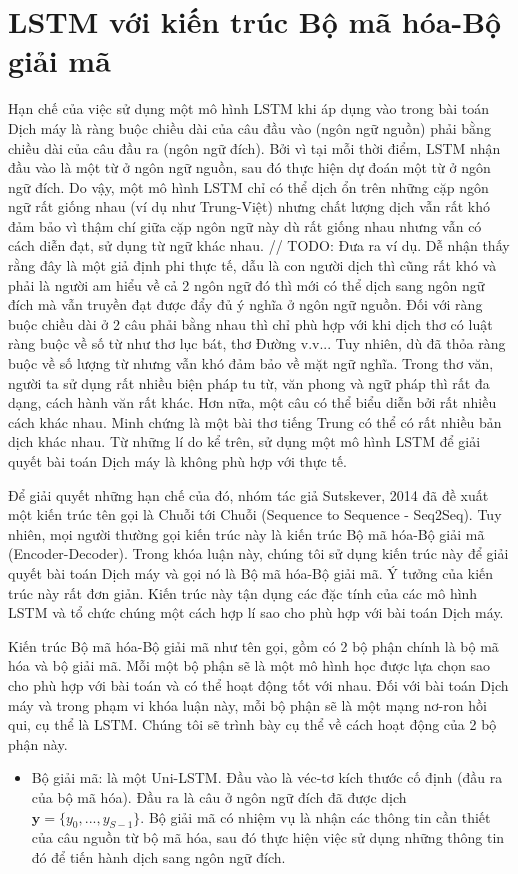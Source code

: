 \section{LSTM với kiến trúc Bộ mã hóa-Bộ giải mã}
Hạn chế của việc sử dụng một mô hình LSTM khi áp dụng vào trong bài toán Dịch máy là ràng buộc chiều dài của câu đầu vào (ngôn ngữ nguồn) phải bằng chiều dài của câu đầu ra (ngôn ngữ đích). Bởi vì tại mỗi thời điểm, LSTM nhận đầu vào là một từ ở ngôn ngữ nguồn, sau đó thực hiện dự đoán một từ ở ngôn ngữ đích. Do vậy, một mô hình LSTM chỉ có thể dịch ổn trên những cặp ngôn ngữ rất giống nhau (ví dụ như Trung-Việt) nhưng chất lượng dịch vẫn rất khó đảm bảo vì thậm chí giữa cặp ngôn ngữ này dù rất giống nhau nhưng vẫn có cách diễn đạt, sử dụng từ ngữ khác nhau. // TODO: Đưa ra ví dụ. Dễ nhận thấy rằng đây là một giả định phi thực tế, dẫu là con người dịch thì cũng rất khó và phải là người am hiểu về cả 2 ngôn ngữ đó thì mới có thể dịch sang ngôn ngữ đích mà vẫn truyền đạt được đẩy đủ ý nghĩa ở ngôn ngữ nguồn. Đối với ràng buộc chiều dài ở 2 câu phải bằng nhau thì chỉ phù hợp với khi dịch thơ có luật ràng buộc về số từ như thơ lục bát, thơ Đường v.v... Tuy nhiên, dù đã thỏa ràng buộc về số lượng từ nhưng vẫn khó đảm bảo về mặt ngữ nghĩa. Trong thơ văn, người ta sử dụng rất nhiều biện pháp tu từ, văn phong và ngữ pháp thì rất đa dạng, cách hành văn rất khác. Hơn nữa, một câu có thể biểu diễn bởi rất nhiều cách khác nhau. Minh chứng là một bài thơ tiếng Trung có thể có rất nhiều bản dịch khác nhau. Từ những lí do kể trên, sử dụng một mô hình LSTM để giải quyết bài toán Dịch máy là không phù hợp với thực tế. 

Để giải quyết những hạn chế của đó, nhóm tác giả Sutskever, 2014 \cite{Seq2Seq2014} đã đề xuất một kiến trúc tên gọi là Chuỗi tới Chuỗi (Sequence to Sequence - Seq2Seq). Tuy nhiên, mọi người thường gọi kiến trúc này là kiến trúc Bộ mã hóa-Bộ giải mã (Encoder-Decoder). Trong khóa luận này, chúng tôi sử dụng kiến trúc này để giải quyết bài toán Dịch máy và gọi nó là Bộ mã hóa-Bộ giải mã. Ý tưởng của kiến trúc này rất đơn giản. Kiến trúc này tận dụng các đặc tính của các mô hình LSTM và tổ chức chúng một cách hợp lí sao cho phù hợp với bài toán Dịch máy. 

Kiến trúc Bộ mã hóa-Bộ giải mã như tên gọi, gồm có 2 bộ phận chính là bộ mã hóa và bộ giải mã. Mỗi một bộ phận sẽ là một mô hình học được lựa chọn sao cho phù hợp với bài toán và có thể hoạt động tốt với nhau. Đối với bài toán Dịch máy và trong phạm vi khóa luận này, mỗi bộ phận sẽ là một mạng nơ-ron hồi qui, cụ thể là LSTM. Chúng tôi sẽ trình bày cụ thể về cách hoạt động của 2 bộ phận này.
\begin{itemize}
	\item Bộ giải mã: là một Uni-LSTM. Đầu vào là véc-tơ kích thước cố định (đầu ra của bộ mã hóa). Đầu ra là câu ở ngôn ngữ đích đã được dịch $\bm{y} = \{y_0, ..., y_{S-1}\}$. Bộ giải mã có nhiệm vụ là nhận các thông tin cần thiết của câu nguồn từ bộ mã hóa, sau đó thực hiện việc sử dụng những thông tin đó để tiến hành dịch sang ngôn ngữ đích.
\end{itemize}
